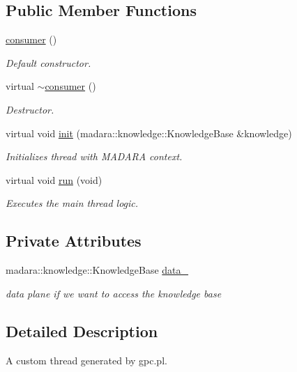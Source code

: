 \subsection*{Public Member Functions}
\begin{DoxyCompactItemize}
\item 
\hyperlink{classthreads_1_1consumer_ae795f2bfd6ded2964f571809e0ea6561}{consumer} ()
\begin{DoxyCompactList}\small\item\em Default constructor. \end{DoxyCompactList}\item 
virtual \hyperlink{classthreads_1_1consumer_aa486915092ce609c11e35b6ac8ae5fe7}{$\sim$consumer} ()
\begin{DoxyCompactList}\small\item\em Destructor. \end{DoxyCompactList}\item 
virtual void \hyperlink{classthreads_1_1consumer_a5c5687cb634bb59115d81e81def30a01}{init} (madara\+::knowledge\+::\+Knowledge\+Base \&knowledge)
\begin{DoxyCompactList}\small\item\em Initializes thread with M\+A\+D\+A\+RA context. \end{DoxyCompactList}\item 
virtual void \hyperlink{classthreads_1_1consumer_aa845379e92c8bb14cd72cb922555c2ec}{run} (void)
\begin{DoxyCompactList}\small\item\em Executes the main thread logic. \end{DoxyCompactList}\end{DoxyCompactItemize}
\subsection*{Private Attributes}
\begin{DoxyCompactItemize}
\item 
madara\+::knowledge\+::\+Knowledge\+Base \hyperlink{classthreads_1_1consumer_ad2ecf700b19fbc6c17f3de8b2e45f39a}{data\+\_\+}
\begin{DoxyCompactList}\small\item\em data plane if we want to access the knowledge base \end{DoxyCompactList}\end{DoxyCompactItemize}


\subsection{Detailed Description}
A custom thread generated by gpc.\+pl. 

